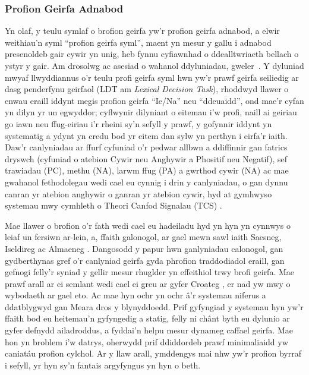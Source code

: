 \subsubsection{Profion Geirfa Adnabod}
Yn olaf, y teulu symlaf o brofion geirfa yw'r profion geirfa adnabod, a elwir weithiau'n syml ``profion geirfa syml'', maent yn mesur y gallu i adnabod presenoldeb gair cywir yn unig, heb fynnu cyfiawnhad o ddealltwriaeth bellach o ystyr y gair. Am drosolwg ac asesiad o wahanol ddyluniadau, gweler~\cite{meara_complexities_1994}. Y dyluniad mwyaf llwyddiannus o'r teulu profi geirfa syml hwn yw'r prawf geirfa seiliedig ar dasg penderfynu geirfaol (LDT am \textit{Lexical Decision Task}), rhoddwyd llawer o enwau eraill iddynt megis profion geirfa ``Ie/Na'' neu ``ddeuaidd'', ond mae'r cyfan yn dilyn yr un egwyddor; cyflwynir dilyniant o eitemau i'w profi, naill ai geiriau go iawn neu ffug-eiriau \parencite{meara_imaginary_2012} i'r rheini sy'n sefyll y prawf, y gofynnir iddynt yn systematig a ydynt yn credu bod yr eitem dan sylw yn perthyn i eirfa'r iaith. Daw'r canlyniadau ar ffurf cyfuniad o'r pedwar allbwn a ddiffinnir gan fatrics dryswch (cyfuniad o atebion Cywir neu Anghywir a Phositif neu Negatif), sef trawiadau (PC), methu (NA), larwm ffug (PA) a gwrthod cywir (NA) ac mae gwahanol fethodolegau wedi cael eu cynnig i drin y canlyniadau, o gan dynnu canran yr atebion anghywir o ganran yr atebion cywir, hyd at gymhwyso systemau mwy cymhleth o Theori Canfod Signalau (TCS) \parencite{huibregtse_scores_2002}.

Mae llawer o brofion o'r fath wedi cael eu hadeiladu hyd yn hyn yn cynnwys o leiaf un fersiwn ar-lein, a, ffaith galonogol, ar gael mewn sawl iaith Saesneg, Iseldireg ac Almaeneg \parencite{lemhofer_introducing_2012}. Dangosodd y papur hwn ganlyniadau calonogol, gan gydberthynas gref o'r canlyniad geirfa gyda phrofion traddodiadol eraill, gan gefnogi felly'r syniad y gellir mesur rhuglder yn effeithiol trwy brofi geirfa. Mae prawf arall ar ei semlant wedi cael ei greu ar gyfer Croateg \parencite{srce_how_2025}, er nad yw mwy o wybodaeth ar gael eto. Ac mae hyn ochr yn ochr â'r systemau niferus a ddatblygwyd gan Meara dros y blynyddoedd\cite{meara_complexities_1994}. Prif gyfyngiad y systemau hyn yw'r ffaith bod eu heitemau'n gyfyngedig a statig, felly ni chânt byth eu dylunio ar gyfer defnydd ailadroddus, a fyddai'n helpu mesur dynameg caffael geirfa. Mae hon yn broblem i'w datrys, oherwydd prif ddiddordeb prawf minimaliaidd yw caniatáu profion cylchol. Ar y llaw arall, ymddengys mai nhw yw'r profion byrraf i sefyll, yr hyn sy'n fantais argyfyngus yn hyn o beth.

